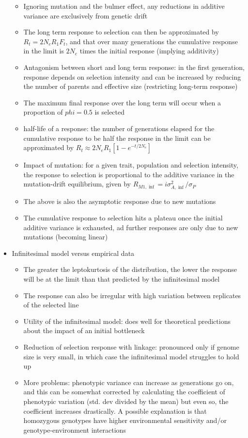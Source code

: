 \documentclass[12pt]{amsart}
\begin{document}
\begin{itemize}
\begin{itemize}
\item Ignoring mutation and the bulmer effect, any reductions in additive variance are exclusively from genetic drift 
\item The long term response to selection can then be approximated by $R_t = 2N_eR_1F_t$, and that over many generations the cumulative response in the limit is $2N_e$ times the initial response (implying additivity)
\item Antagonism between short and long term response: in the first generation, response depends on selection intensity and can be increased by reducing the number of parents and effective size (restricting long-term response)
\item The maximum final response over the long term will occur when a proportion of $phi = 0.5$ is selected
\item half-life of a response: the number of generations elapsed for the cumulative response to be half the response in the limit can be approximated by $R_t \approx 2N_eR_1[1-e^{-t/2N_e}]$ 
\item Impact of mutation: for a given trait, population and selection intensity, the response to selection is proportional to the additive variance in the mutation-drift equilibrium, given by $R_{M1,\inf} = i\sigma_{A,\inf}^2/\sigma_P$
\item The above is also the asymptotic response due to new mutations 
\item The cumulative response to selection hits a plateau once the initial additive variance is exhausted, ad further responses are only due to new mutations (becoming linear) 
\end{itemize}
\item Infinitesimal model versus empirical data
\begin{itemize}
\item The greater the leptokurtosis of the distribution, the lower the response will be at the limit than that predicted by the infinitesimal model
\item The response can also be irregular with high variation between replicates of the selected line
\item Utility of the infinitesimal model: does well for theoretical predictions about the impact of an initial bottleneck
\item Reduction of selection response with linkage: pronounced only if genome size is very small, in which case the infinitesimal model struggles to hold up
\item More problems: phenotypic variance can increase as generations go on, and this can be somewhat corrected by calculating the coefficient of phenotypic variation (std. dev divided by the mean) but even so, the coefficient increases drastically. A possible explanation is that homozygous genotypes have higher environmental sensitivity and/or genotype-environment interactions 

\end{itemize}
\end{itemize}
\end{document}
